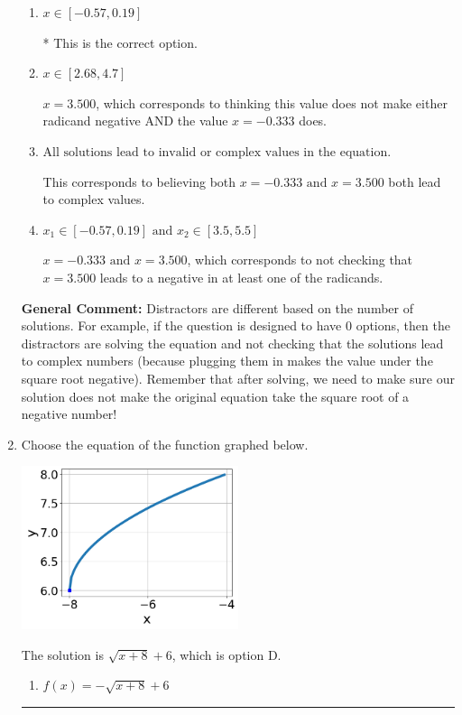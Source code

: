 \documentclass{extbook}[14pt]
\newcommand{\litem}[1]{\item #1

\rule{\textwidth}{0.4pt}}
\begin{document}
\begin{enumerate}
{\begin{enumerate}[label=\Alph*.]
$x = 0.333 \text{ and } x = 3.500$, which corresponds to negatives or the absolute value of the values you would have gotten by solving the equation correctly.
\item \( x \in [-0.57,0.19] \)

* This is the correct option.
\item \( x \in [2.68,4.7] \)

$x = 3.500$, which corresponds to thinking this value does not make either radicand negative AND the value $x = -0.333$ does.
\item \( \text{All solutions lead to invalid or complex values in the equation.} \)

This corresponds to believing both $x = -0.333 \text{ and } x = 3.500$ both lead to complex values.
\item \( x_1 \in [-0.57, 0.19] \text{ and } x_2 \in [3.5,5.5] \)

$x = -0.333 \text{ and } x = 3.500$, which corresponds to not checking that $x = 3.500$ leads to a negative in at least one of the radicands.
\end{enumerate}

\textbf{General Comment:} Distractors are different based on the number of solutions. For example, if the question is designed to have 0 options, then the distractors are solving the equation and not checking that the solutions lead to complex numbers (because plugging them in makes the value under the square root negative). Remember that after solving, we need to make sure our solution does not make the original equation take the square root of a negative number!
}
\litem{
Choose the equation of the function graphed below.

\begin{center}
    \includegraphics[width=0.5\textwidth]{../Figures/radicalGraphToEquationCopyC.png}
\end{center}


The solution is \( \sqrt{x + 8} + 6 \), which is option D.\begin{enumerate}[label=\Alph*.]
\item \( f(x) = - \sqrt{x + 8} + 6 \)


\end{enumerate}}
\end{enumerate}
\end{document}

